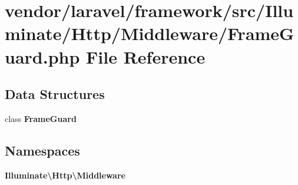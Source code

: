 \section{vendor/laravel/framework/src/\+Illuminate/\+Http/\+Middleware/\+Frame\+Guard.php File Reference}
\label{_frame_guard_8php}
\subsection*{Data Structures}
\begin{DoxyCompactItemize}
\item 
class {\bf Frame\+Guard}
\end{DoxyCompactItemize}
\subsection*{Namespaces}
\begin{DoxyCompactItemize}
\item 
 {\bf Illuminate\textbackslash{}\+Http\textbackslash{}\+Middleware}
\end{DoxyCompactItemize}
